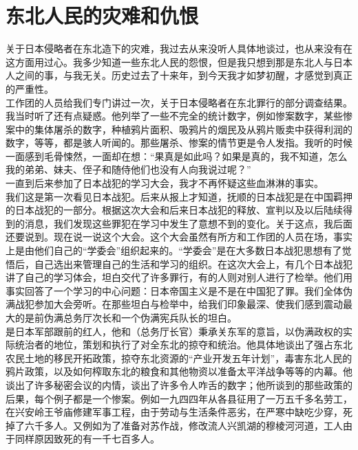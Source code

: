 \fancyhead[RO]{\thepage} %
\fancyhead[LE]{\thepage} %
\chapter*{东北人民的灾难和仇恨}
关于日本侵略者在东北造下的灾难，我过去从来没听人具体地谈过，也从来没有在这方面用过心。我多少知道一些东北人民的怨恨，但是我只想到那是东北人与日本人之间的事，与我无关。历史过去了十来年，到今天我才如梦初醒，才感觉到真正的严重性。\\

工作团的人员给我们专门讲过一次，关于日本侵略者在东北罪行的部分调查结果。我当时听了还有点疑惑。他列举了一些不完全的统计数字，例如惨案数字，某些惨案中的集体屠杀的数字，种植鸦片面积、吸鸦片的烟民及从鸦片贩卖中获得利润的数字，等等，都是骇人听闻的。那些屠杀、惨案的情节更是令人发指。我听的时候一面感到毛骨悚然，一面却在想：“果真是如此吗？如果是真的，我不知道，怎么我的弟弟、妹夫、侄子和随侍他们也没有人向我说过呢？”\\

一直到后来参加了日本战犯的学习大会，我才不再怀疑这些血淋淋的事实。\\

我们这是第一次看见日本战犯。后来从报上才知道，抚顺的日本战犯是在中国羁押的日本战犯的一部分。根据这次大会和后来日本战犯的释放、宣判以及以后陆续得到的消息，我们发现这些罪犯在学习中发生了意想不到的变化。关于这点，我后面还要说到。现在说一说这个大会。这个大会虽然有所方和工作团的人员在场，事实上是由他们自己的“学委会”组织起来的。“学委会”是在大多数日本战犯思想有了觉悟后，自己选出来管理自己的生活和学习的组织。在这次大会上，有几个日本战犯讲了自己的学习体会，坦白交代了许多罪行，有的人则对别人进行了检举。他们用事实回答了一个学习的中心问题：日本帝国主义是不是在中国犯了罪。我们全体伪满战犯参加大会旁听。在那些坦白与检举中，给我们印象最深、使我们感到震动最大的是前伪满总务厅次长和一个伪满宪兵队长的坦白。\\

是日本军部跟前的红人，他和（总务厅长官）秉承关东军的意旨，以伪满政权的实际统治者的地位，策划和执行了对全东北的掠夺和统治。他具体地谈出了强占东北农民土地的移民开拓政策，掠夺东北资源的“产业开发五年计划”，毒害东北人民的鸦片政策，以及如何榨取东北的粮食和其他物资以准备太平洋战争等等的内幕。他谈出了许多秘密会议的内情，谈出了许多令人咋舌的数字；他所谈到的那些政策的后果，每个例子都是一个惨案。例如一九四四年从各县征用了一万五千多名劳工，在兴安岭王爷庙修建军事工程，由于劳动与生活条件恶劣，在严寒中缺吃少穿，死掉了六千多人。又例如为了准备对苏作战，修改流人兴凯湖的穆棱河河道，工人由于同样原因致死的有一千七百多人。\\

